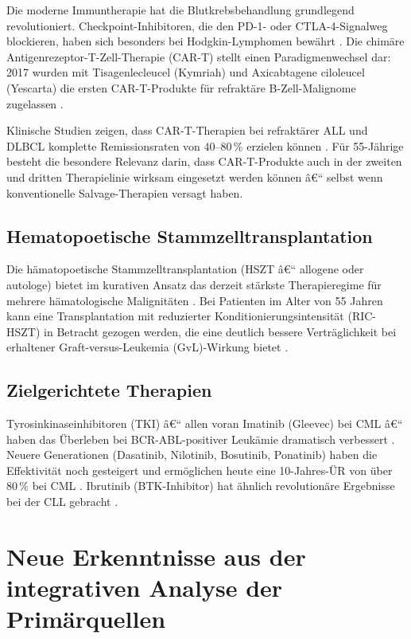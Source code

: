 ﻿\documentclass[12pt,a4paper]{article}
\theoremstyle{definition}
\begin{document}
Die moderne Immuntherapie hat die Blutkrebsbehandlung grundlegend revolutioniert.
Checkpoint-Inhibitoren, die den PD-1- oder CTLA-4-Signalweg blockieren, haben sich
besonders bei Hodgkin-Lymphomen bewährt \cite{adeyemi2025}. Die chimäre
Antigenrezeptor-T-Zell-Therapie (CAR-T) stellt einen Paradigmenwechsel dar: 2017
wurden mit Tisagenlecleucel (Kymriah) und Axicabtagene ciloleucel (Yescarta) die
ersten CAR-T-Produkte für refraktäre B-Zell-Malignome zugelassen \cite{june2018}.

Klinische Studien zeigen, dass CAR-T-Therapien bei refraktärer ALL und DLBCL
komplette Remissionsraten von 40--80\,\% erzielen können \cite{maude2018,locke2019}.
Für 55-Jährige besteht die besondere Relevanz darin, dass CAR-T-Produkte auch in der
zweiten und dritten Therapielinie wirksam eingesetzt werden können â€“ selbst wenn
konventionelle Salvage-Therapien versagt haben.

\subsection{Hematopoetische Stammzelltransplantation}

Die hämatopoetische Stammzelltransplantation (HSZT â€“ allogene oder autologe)
bietet im kurativen Ansatz das derzeit stärkste Therapieregime für mehrere
hämatologische Malignitäten \cite{adeyemi2025}. Bei Patienten im Alter von 55 Jahren
kann eine Transplantation mit reduzierter Konditionierungsintensität (RIC-HSZT)
in Betracht gezogen werden, die eine deutlich bessere Verträglichkeit bei erhaltener
Graft-versus-Leukemia (GvL)-Wirkung bietet \cite{schroeder2018,schroeder2018b}.

\subsection{Zielgerichtete Therapien}

Tyrosinkinaseinhibitoren (TKI) â€“ allen voran Imatinib (Gleevec) bei CML â€“ haben das
Überleben bei BCR-ABL-positiver Leukämie dramatisch verbessert \cite{druker2006}.
Neuere Generationen (Dasatinib, Nilotinib, Bosutinib, Ponatinib) haben die
Effektivität noch gesteigert und ermöglichen heute eine 10-Jahres-ÜR von über 80\,\%
bei CML \cite{hochhaus2017}. Ibrutinib (BTK-Inhibitor) hat ähnlich revolutionäre
Ergebnisse bei der CLL gebracht \cite{mccabe2015}.

\section{Neue Erkenntnisse aus der integrativen Analyse der Primärquellen}
\label{sec:neue_erkenntnisse}
\end{document}
